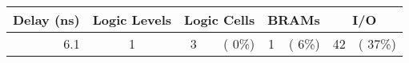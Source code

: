 % 
% 
\begin{tabular}{rc|rr|rr|rr}
 Delay (ns) & Logic Levels & \multicolumn{2}{c|}{Logic Cells} & \multicolumn{2}{c|}{BRAMs} & \multicolumn{2}{c}{I/O} \\
\hline
    6.1 &      1  &     3 & (  0\%)  &  1 & (  6\%) &    42 & ( 37\%)\\ 
\end{tabular}
